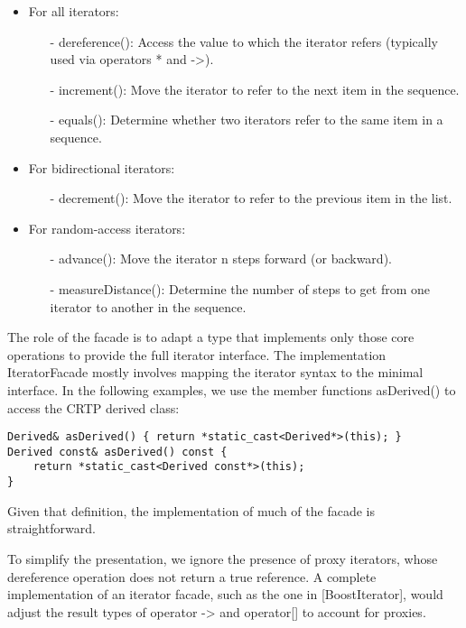 \begin{itemize}
\item 
For all iterators:
\begin{itemize}
\item [-]
dereference(): Access the value to which the iterator refers (typically used via operators * and ->).

\item [-]
increment(): Move the iterator to refer to the next item in the sequence.

\item [-]
equals(): Determine whether two iterators refer to the same item in a sequence.
\end{itemize}

\item 
For bidirectional iterators:
\begin{itemize}
\item [-]
decrement(): Move the iterator to refer to the previous item in the list.
\end{itemize}

\item 
For random-access iterators:
\begin{itemize}
\item [-]
advance(): Move the iterator n steps forward (or backward).

\item [-]
measureDistance(): Determine the number of steps to get from one iterator to another in the sequence.
\end{itemize}
\end{itemize}

The role of the facade is to adapt a type that implements only those core operations to provide the full iterator interface. The implementation IteratorFacade mostly involves mapping the iterator syntax to the minimal interface. In the following examples, we use the member functions asDerived() to access the CRTP derived class:

\begin{lstlisting}[style=styleCXX]
Derived& asDerived() { return *static_cast<Derived*>(this); }
Derived const& asDerived() const {
	return *static_cast<Derived const*>(this);
}
\end{lstlisting}

Given that definition, the implementation of much of the facade is straightforward.

\begin{tcolorbox}[colback=webgreen!5!white,colframe=webgreen!75!black]
\hspace*{0.75cm}To simplify the presentation, we ignore the presence of proxy iterators, whose dereference operation does not return a true reference. A complete implementation of an iterator facade, such as the one in [BoostIterator], would adjust the result types of operator -> and operator[] to account for proxies.
\end{tcolorbox}

